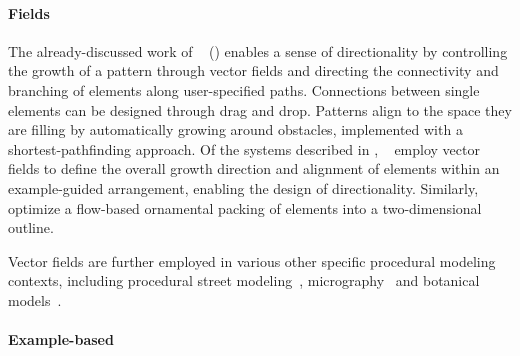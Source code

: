 \paragraph*{Fields}
The already-discussed work of \citeauthor*{gieseke_2017_ooo}~\cite{gieseke_2017_ooo} () enables a sense of directionality by controlling the growth of a pattern through vector fields and directing the connectivity and branching of elements along user-specified paths. Connections between single elements can be designed through drag and drop. Patterns align to the space they are filling by automatically growing around obstacles, implemented with a shortest-pathfinding approach. Of the systems described in  , \citeauthor*{ijiri_2008_aeb}~\cite{ijiri_2008_aeb} employ vector fields to define the overall growth direction and alignment of elements within an example-guided arrangement, enabling the design of directionality. Similarly, \citeauthor*{saputra_2017_ffo}~\cite{saputra_2017_ffo} optimize a flow-based ornamental packing of elements into a two-dimensional outline. 

Vector fields are further employed in various other specific procedural modeling contexts, including procedural street modeling~\cite{chen_2008_ips}, micrography~\cite{maharik_2011_dm} and botanical models~\cite{xu_2015_ptm}.

\paragraph*{Example-based}

